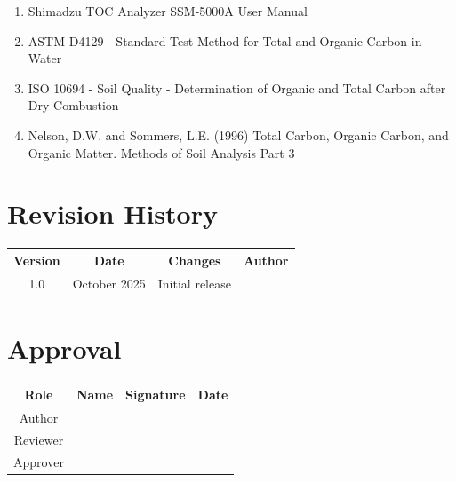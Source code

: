 \documentclass[11pt,a4paper]{article}\usepackage[]{graphicx}\usepackage[]{xcolor}
\begin{document}
\begin{enumerate}
    \item Shimadzu TOC Analyzer SSM-5000A User Manual
    \item ASTM D4129 - Standard Test Method for Total and Organic Carbon in Water
    \item ISO 10694 - Soil Quality - Determination of Organic and Total Carbon after Dry Combustion
    \item Nelson, D.W. and Sommers, L.E. (1996) Total Carbon, Organic Carbon, and Organic Matter. Methods of Soil Analysis Part 3
\end{enumerate}

\section{Revision History}

\begin{table}[h]
\centering
\begin{tabular}{cccc}
\toprule
\textbf{Version} & \textbf{Date} & \textbf{Changes} & \textbf{Author} \\
\midrule
1.0 & October 2025 & Initial release & \\
\bottomrule
\end{tabular}
\end{table}

\section{Approval}

\begin{table}[h]
\centering
\begin{tabular}{cccc}
\toprule
\textbf{Role} & \textbf{Name} & \textbf{Signature} & \textbf{Date} \\
\midrule
Author & & & \\[0.5cm]
Reviewer & & & \\[0.5cm]
Approver & & & \\[0.5cm]
\bottomrule
\end{tabular}
\end{table}
\end{document}
